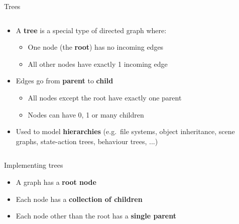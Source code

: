 \begin{frame}{Trees}
\begin{columns}
		\begin{column}{0.68\textwidth}
			\begin{itemize}
				\pause\item A \textbf{tree} is a special type of directed graph where:
					\begin{itemize}
						\pause\item One node (the \textbf{root}) has no incoming edges
						\pause\item All other nodes have exactly 1 incoming edge
					\end{itemize}
				\pause\item Edges go from \textbf{parent} to \textbf{child}
					\begin{itemize}
						\pause\item All nodes except the root have exactly one parent
						\pause\item Nodes can have 0, 1 or many children
					\end{itemize}
				\pause\item Used to model \textbf{hierarchies} (e.g.\ file systems, object inheritance, scene graphs, state-action trees, behaviour trees, ...)
			\end{itemize}
		\end{column}
	\end{columns}
\end{frame}

\begin{frame}{Implementing trees}
	\begin{itemize}
		\pause\item A graph has a \textbf{root node}
		\pause\item Each node has a \textbf{collection of children}
		\pause\item Each node other than the root has a \textbf{single parent}
	\end{itemize}
\end{frame}
